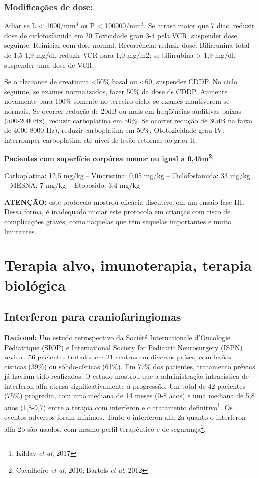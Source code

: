 \documentclass[11pt,a4paper,oldfontcommands]{memoir}
\begin{document}
\subsection{Modificações de dose:}

Adiar se L < 1000/mm\(^3\) ou P < 100000/mm\(^3\). Se atraso maior que 7 dias, reduzir dose de ciclofosfamida em 20%
Toxicidade grau 3-4 pela VCR, suspender dose seguinte. Reiniciar com dose normal. Recorrência: reduzir dose.
Bilirrunina total de 1,5-1,9 mg/dl, reduzir VCR para 1,0 mg/m2; se bilirrubina > 1,9 mg/dl, suspender uma dose de VCR.

Se o clearance de creatinina <50\% basal ou <60, suspender CDDP. No ciclo seguinte, se exames normalizados, fazer 50\% da dose de CDDP. Aumente novamente para 100\% somente no terceiro ciclo, se exames mantiverem-se normais.
Se ocorrer redução de 20dB ou mais em freqüências auditivas baixas (500-2000Hz), reduzir carboplatina em 50\%. Se ocorrer redução de 30dB na faixa de 4000-8000 Hz), reduzir carboplatina em 50\%. Ototoxicidade grau IV: interromper carboplatina até nível de lesão retornar ao grau II.

\textbf{Pacientes com superfície corpórea menor ou igual a 0,45m\textsuperscript{2}}:

Carboplatina: 12,5 mg/kg – Vincristina: 0,05 mg/kg – Ciclofosfamida: 33 mg/kg – MESNA: 7 mg/kg – Etoposido: 3,4 mg/kg

\textbf{ATENÇÃO:} este protocolo mostrou eficácia discutível em um ensaio fase III. Dessa forma, é inadequado iniciar este protocolo em crianças com risco de complicações graves, como naquelas que têm sequelas importantes e muito limitantes.

\cleardoublepage
\chapter{Terapia alvo, imunoterapia, terapia biológica}
\cleardoublepage

\section{Interferon para craniofaringiomas}
{\let\thefootnote\relax{}}

\textbf{Racional:} Um estudo retrospectivo da Société Internationale d'Oncologie Pédiatrique (SIOP) e International Society for Pediatric Neurosurgery (ISPN) revisou 56 pacientes tratados em 21 centros em diversos países, com lesões císticas (39\%) ou sólido-císticas (61\%). Em 77\% dos pacientes, tratamento prévios já haviam sido realizados. O estudo mostrou que a administração intracística de interferon alfa atrasa significativamente a progressão. Um total de 42 pacientes (75\%) progrediu, com uma mediana de 14 meses (0-8 anos) e uma mediana de 5,8 anos (1,8-9,7) entre a terapia com interferon e o tratamento definitivo\footnote{Kilday \textit{et al}, 2017}. Os eventos adversos foram mínimos. Tanto o interferon alfa 2a quanto o interferon alfa 2b são usados, com mesmo perfil terapêutico e de segurança\footnote{Cavalheiro \textit{et al}, 2010; Bartels \textit{et al}, 2012}.
\end{document}
